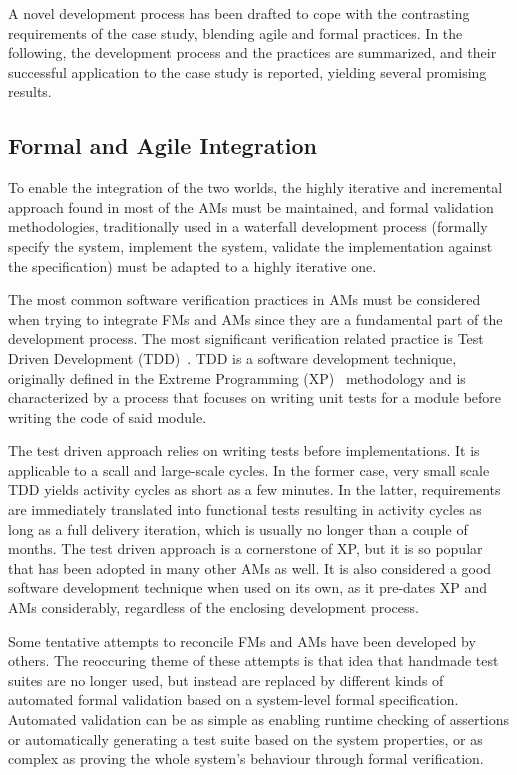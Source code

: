 \documentclass[english]{lni}
\begin{document}
A novel development process has been drafted to cope with the
contrasting requirements of the case study, blending agile and formal
practices.  In the following, the development process and the practices
are summarized, and their successful application to the case study is
reported, yielding several promising results.

\subsection{Formal and Agile Integration}
\label{subsec:formal_and_agile_integration}

To enable the integration of the two worlds, the highly iterative and
incremental approach found in most of the AMs must be maintained, and
formal validation methodologies, traditionally used in a waterfall
development process (formally specify the system, implement the
system, validate the implementation against the specification) must
be adapted to a highly iterative one.

The most common software verification practices in AMs must be
considered when trying to integrate FMs and AMs since they are a
fundamental part of the development process.  The most significant
verification related practice is Test Driven Development
(TDD)~\cite{Beck2003}.  TDD is a software development technique,
originally defined in the Extreme Programming (XP)~\cite{Beck2004}
methodology and is characterized by a process that focuses on writing
unit tests for a module before writing the code of said module.

The test driven approach relies on writing tests before
implementations.  It is applicable to a scall and large-scale cycles.
In the former case, very small scale TDD yields activity cycles as
short as a few minutes.  In the latter, requirements are immediately
translated into functional tests resulting in activity cycles as long
as a full delivery iteration, which is usually no longer than a couple
of months.  The test driven approach is a cornerstone of XP, but it is
so popular that has been adopted in many other AMs as well.  It is
also considered a good software development technique when used on its
own, as it pre-dates XP and AMs considerably, regardless of the
enclosing development process.

Some tentative attempts to reconcile FMs and AMs have been developed
by others.  The reoccuring theme of these attempts is that idea that
handmade test suites are no longer used, but instead are replaced by
different kinds of automated formal validation based on a system-level
formal specification.  Automated validation can be as simple as
enabling runtime checking of assertions or automatically generating a
test suite based on the system properties, or as complex as proving
the whole system's behaviour through formal verification.
\end{document}
